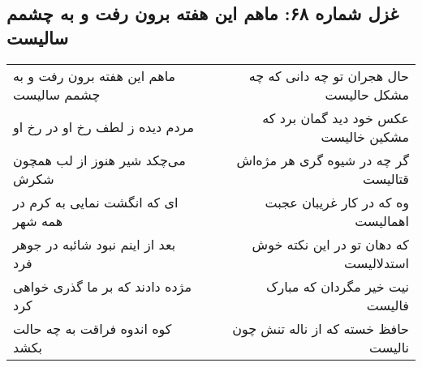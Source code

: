 \begin{center}
\section*{غزل شماره ۶۸: ماهم این هفته برون رفت و به چشمم سالیست}
\label{sec:sh068}
\begin{longtable}{l p{0.5cm} r}
ماهم این هفته برون رفت و به چشمم سالیست
&&
حال هجران تو چه دانی که چه مشکل حالیست
\\
مردم دیده ز لطف رخ او در رخ او
&&
عکس خود دید گمان برد که مشکین خالیست
\\
می‌چکد شیر هنوز از لب همچون شکرش
&&
گر چه در شیوه گری هر مژه‌اش قتالیست
\\
ای که انگشت نمایی به کرم در همه شهر
&&
وه که در کار غریبان عجبت اهمالیست
\\
بعد از اینم نبود شائبه در جوهر فرد
&&
که دهان تو در این نکته خوش استدلالیست
\\
مژده دادند که بر ما گذری خواهی کرد
&&
نیت خیر مگردان که مبارک فالیست
\\
کوه اندوه فراقت به چه حالت بکشد
&&
حافظ خسته که از ناله تنش چون نالیست
\\
\end{longtable}
\end{center}
